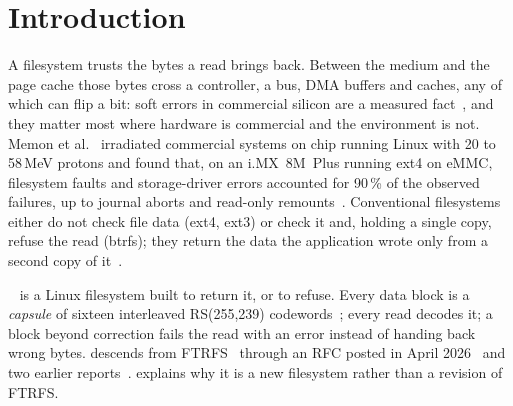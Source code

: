 \section{Introduction}\label{sec:intro}

A filesystem trusts the bytes a read brings back. Between the medium and
the page cache those bytes cross a controller, a bus, DMA buffers and
caches, any of which can flip a bit: soft errors in commercial silicon
are a measured fact~\cite{baumann2005}, and they matter most where
hardware is commercial and the environment is not. Memon et
al.~\cite{memon2025tr,memon2025arxiv} irradiated commercial systems on
chip running Linux with 20 to 58\,MeV protons and found that, on an
i.MX~8M~Plus running ext4 on eMMC, filesystem faults and storage-driver
errors accounted for 90\,\% of the observed failures, up to journal
aborts and read-only remounts~\cite{memon2025arxiv}. Conventional
filesystems either do not check file data (ext4, ext3) or check it and,
holding a single copy, refuse the read (btrfs); they return the data the
application wrote only from a second copy of
it~\cite{btrfsautorepair,zfschecksums}.

\bfs~\cite{beamfsimpl} is a Linux filesystem built to return it, or to
refuse. Every data block is a \emph{capsule} of sixteen interleaved
RS(255,239) codewords~\cite{reed1960,macwilliams1977}; every read decodes
it; a block beyond correction fails the read with an error instead of
handing back wrong bytes. \bfs descends from FTRFS~\cite{fuchs2015ftrfs}
through an RFC posted in April 2026~\cite{ftrfsrfc} and two earlier
reports~\cite{desbrieres2026ftrfs,desbrieres2026beamfsv2}.
 explains why it is a new filesystem rather than a
revision of FTRFS.

